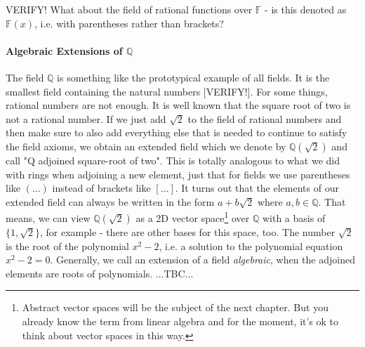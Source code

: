 VERIFY! What about the field of rational functions over $\mathbb{F}$ - is this denoted as $\mathbb{F}(x)$, i.e. with parentheses rather than brackets?









\paragraph{Algebraic Extensions of $\mathbb{Q}$}
The field $\mathbb{Q}$ is something like the prototypical example of all fields. It is the smallest field containing the natural numbers [VERIFY!]. For some things, rational numbers are not enough. It is well known that the square root of two is not a rational number. If we just add $\sqrt{2}$ to the field of rational numbers and then make sure to also add everything else that is needed to continue to satisfy the field axioms, we obtain an extended field which we denote by $\mathbb{Q}(\sqrt{2})$ and call "Q adjoined square-root of two". This is totally analogous to what we did with rings when adjoining a new element, just that for fields we use parentheses like $(\ldots)$ instead of brackets like $[\ldots]$. It turns out that the elements of our extended field can always be written in the form $a + b \sqrt{2}$ where $a,b \in \mathbb{Q}$. That means, we can view $\mathbb{Q}(\sqrt{2})$ as a 2D vector space\footnote{Abstract vector spaces will be the subject of the next chapter. But you already know the term from linear algebra and for the moment, it's ok to think about vector spaces in this way.} over $\mathbb{Q}$ with a basis of $\{1, \sqrt{2}\}$, for example - there are other bases for this space, too. The number $\sqrt{2}$ is the root of the polynomial $x^2 - 2$, i.e. a solution to the polynomial equation $x^2 - 2 = 0$. Generally, we call an extension of a field \emph{algebraic}, when the adjoined elements are roots of polynomials. ...TBC...

